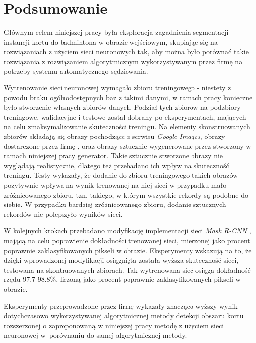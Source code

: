 \chapter{Podsumowanie}

Głównym celem niniejszej pracy była eksploracja zagadnienia segmentacji instancji kortu do badmintona w obrazie wejściowym, skupiając się na rozwiązaniach z użyciem sieci neuronowych tak, aby można było porównać takie rozwiązania z rozwiązaniem algorytmicznym wykorzystywanym przez firmę \blue{} na potrzeby systemu automatycznego sędziowania.

Wytrenowanie sieci neuronowej wymagało zbioru treningowego - niestety z powodu braku ogólnodostępnych baz z takimi danymi, w ramach pracy konieczne było stworzenie własnych zbiorów danych. Podział tych zbiorów na podzbiory treningowe, walidacyjne i testowe został dobrany po eksperymentach, mających na celu zmaksymalizowanie skuteczności treningu. Na elementy skonstruowanych zbiorów składają się obrazy pochodzące z serwisu \textit{Google Images}, obrazy dostarczone przez firmę \blue{}, oraz obrazy sztucznie wygenerowane przez stworzony w ramach niniejszej pracy generator. Takie sztucznie stworzone obrazy nie wyglądają realistycznie, dlatego też przebadano ich wpływ na skuteczność treningu. Testy wykazały, że dodanie do zbioru treningowego takich obrazów pozytywnie wpływa na wynik trenowanej na niej sieci w przypadku mało zróżnicowanego zbioru, tzn. takiego, w którym wszystkie rekordy są podobne do siebie. W przypadku bardziej zróżnicowanego zbioru, dodanie sztucznych rekordów nie polepszyło wyników sieci.

W kolejnych krokach przebadano modyfikację implementacji sieci \textit{Mask R-CNN} \cite{matterport-mask-rcnn}, mającą na celu poprawienie dokładności trenowanej sieci, mierzonej jako procent poprawnie zaklasyfikowanych pikseli w obrazie. Eksperymenty wskazują na to, że dzięki wprowadzonej modyfikacji osiągnięta została wyższa skuteczność sieci, testowana na skontruowanych zbiorach. Tak wytrenowana sieć osiąga dokładność rzędu 97.7-98.8\%, liczoną jako procent poprawnie zaklasyfikowanych pikseli w obrazie. 

Eksperymenty przeprowadzone przez firmę \blue{} wykazały znacząco wyższy wynik dotychczasowo wykorzystywanej algorytmicznej metody detekcji obszaru kortu rozszerzonej o zaproponowaną w niniejszej pracy metodę z użyciem sieci neuronowej w~porównaniu do samej algorytmicznej metody.

